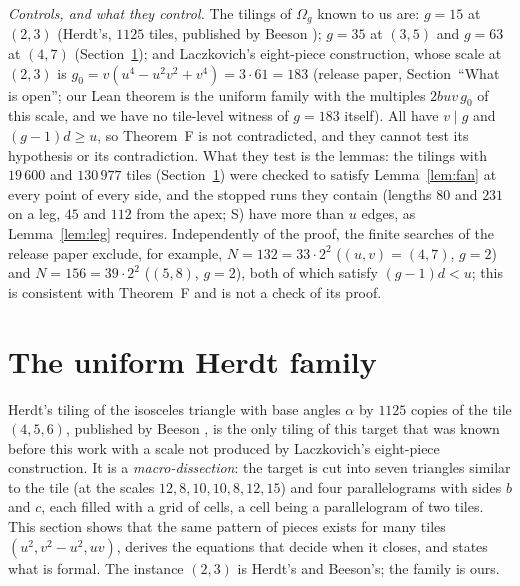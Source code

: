 \documentclass[11pt,reqno]{amsart}
\theoremstyle{plain}
\theoremstyle{definition}
\newcommand{\sS}{\textup{\textsf{S}}}
\begin{document}
\emph{Controls, and what they control.} The tilings of $\Omega_{g}$ known to us are: $g=15$ at $(2,3)$ (Herdt's, $1125$ tiles, published by Beeson \cite{BeesonIso}); $g=35$ at $(3,5)$ and $g=63$ at $(4,7)$ (Section~\ref{sec:herdt}); and Laczkovich's eight-piece construction, whose scale at $(2,3)$ is $g_0=v(u^4-u^2v^2+v^4)=3\cdot61=183$ (release paper, Section~``What is open''; our Lean theorem  is the uniform family with the multiples $2buv\,g_0$ of this scale, and we have no tile-level witness of $g=183$ itself). All have $v\mid g$ and $(g-1)d\ge u$, so Theorem~F is not contradicted, and they cannot test its hypothesis or its contradiction. What they test is the lemmas: the tilings with $19\,600$ and $130\,977$ tiles (Section~\ref{sec:herdt}) were checked to satisfy Lemma~\ref{lem:fan} at every point of every side, and the stopped runs they contain (lengths $80$ and $231$ on a leg, $45$ and $112$ from the apex; \sS) have more than $u$ edges, as Lemma~\ref{lem:leg} requires. Independently of the proof, the finite searches of the release paper exclude, for example, $N=132=33\cdot2^2$ ($(u,v)=(4,7)$, $g=2$) and $N=156=39\cdot2^2$ ($(5,8)$, $g=2$), both of which satisfy $(g-1)d<u$; this is consistent with Theorem~F and is not a check of its proof.

\section{The uniform Herdt family}\label{sec:herdt}

Herdt's tiling of the isosceles triangle with base angles $\alpha$ by $1125$ copies of the tile $(4,5,6)$, published by Beeson
\cite[Fig.~23]{BeesonIso}, is the only tiling of this target that was known before this work with a scale not produced by
Laczkovich's eight-piece construction. It is a \emph{macro-dissection}: the target is cut into seven triangles similar to the tile
(at the scales $12,8,10,10,8,12,15$) and four parallelograms with sides $b$ and $c$, each filled with a grid of cells, a cell being a parallelogram of two tiles.
This section shows that the same pattern of pieces exists for many tiles $(u^2,v^2-u^2,uv)$, derives the equations that decide when it closes, and states what is formal.
The instance $(2,3)$ is Herdt's and Beeson's; the family is ours.
\end{document}
